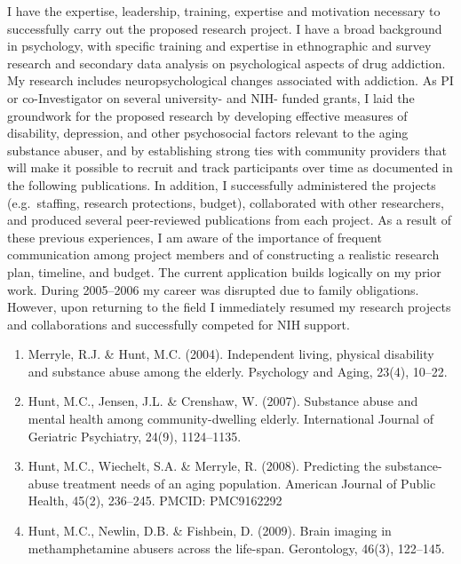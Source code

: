 \documentclass{nihbiosketch}
\begin{document}
\begin{statement}
I have the expertise, leadership, training, expertise and motivation necessary
to successfully carry out the proposed research project.  I have a broad
background in psychology, with specific training and expertise in ethnographic
and survey research and secondary data analysis on psychological aspects of
drug addiction.  My research includes neuropsychological changes associated
with addiction.  As PI or co-Investigator on several university- and NIH-
funded grants, I laid the groundwork for the proposed research by developing
effective measures of disability, depression, and other psychosocial factors
relevant to the aging substance abuser, and by establishing strong ties with
community providers that will make it possible to recruit and track
participants over time as documented in the following publications.  In
addition, I successfully administered the projects (e.g.\ staffing, research
protections, budget), collaborated with other researchers, and produced several
peer-reviewed publications from each project.  As a result of these previous
experiences, I am aware of the importance of frequent communication among
project members and of constructing a realistic research plan, timeline, and
budget.  The current application builds logically on my prior work. During
2005--2006 my career was disrupted due to family obligations. However, upon
returning to the field I immediately resumed my research projects and
collaborations and successfully competed for NIH support.

\begin{enumerate}

\item Merryle, R.J. \& Hunt, M.C. (2004). Independent living, physical
        disability and substance abuse among the elderly. Psychology and Aging,
        23(4), 10--22.

\item Hunt, M.C., Jensen, J.L. \& Crenshaw, W. (2007). Substance abuse and
        mental health among community-dwelling elderly. International Journal
        of Geriatric Psychiatry, 24(9), 1124--1135.

\item Hunt, M.C., Wiechelt, S.A. \& Merryle, R. (2008). Predicting the
        substance-abuse treatment needs of an aging population.  American
        Journal of Public Health, 45(2), 236--245. PMCID: PMC9162292 
        
\item Hunt, M.C., Newlin, D.B. \& Fishbein, D. (2009). Brain imaging in
        methamphetamine abusers across the life-span. Gerontology, 46(3),
        122--145.

\end{enumerate}

\end{statement}
\end{document}
